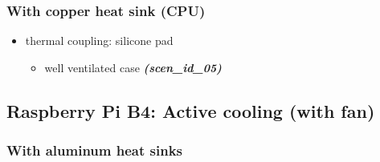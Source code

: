 \documentclass[10pt,parskip=half,
toc=sectionentrywithdots,
bibliography=totocnumbered,
captions=tableheading,numbers=noendperiod]{scrartcl}
\providecommand{\tightlist}{%
  \setlength{\itemsep}{0pt}\setlength{\parskip}{0pt}}
\begin{document}
\hypertarget{with-copper-heat-sink-cpu}{%
\subsubsection{With copper heat sink
(CPU)}\label{with-copper-heat-sink-cpu}}

\begin{itemize}
\tightlist
\item
  thermal coupling: silicone pad

  \begin{itemize}
  \tightlist
  \item
    well ventilated case \textbf{\emph{(scen\_id\_05)}}
  \end{itemize}
\end{itemize}

\hypertarget{raspberry-pi-b4-active-cooling-with-fan}{%
\subsection{Raspberry Pi B4: Active cooling (with
fan)}\label{raspberry-pi-b4-active-cooling-with-fan}}

\hypertarget{with-aluminum-heat-sinks}{%
\subsubsection{With aluminum heat
sinks}\label{with-aluminum-heat-sinks}}
\end{document}
